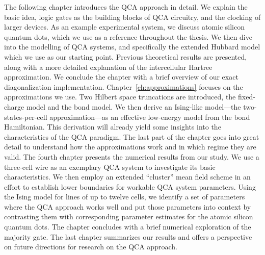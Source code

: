 The following chapter introduces the QCA approach in detail. We explain the
basic idea, logic gates as the building blocks of QCA circuitry, and the
clocking of larger devices. As an example experimental system, we discuss atomic
silicon quantum dots, which we use as a reference throughout the thesis. We then
dive into the modelling of QCA systems, and specifically the extended Hubbard
model which we use as our starting point. Previous theoretical results are
presented, along with a more detailed explanation of the intercellular Hartree
approximation. We conclude the chapter with a brief overview of our exact
diagonalization implementation. Chapter~\ref{ch:approximations} focuses on the
approximations we use. Two Hilbert space truncations are introduced, the
fixed-charge model and the bond model. We then derive an Ising-like model---the
two-states-per-cell approximation---as an effective low-energy model from the
bond Hamiltonian. This derivation will already yield some insights into the
characteristics of the QCA paradigm. The last part of the chapter goes into
great detail to understand how the approximations work and in which regime they
are valid. The fourth chapter presents the numerical results from our study. We
use a three-cell wire as an exemplary QCA system to investigate its basic
characteristics. We then employ an extended ``cluster'' mean field scheme in an
effort to establish lower boundaries for workable QCA system parameters. Using
the Ising model for lines of up to twelve cells, we identify a set of parameters
where the QCA approach works well and put those parameters into context by
contrasting them with corresponding parameter estimates for the atomic silicon
quantum dots. The chapter concludes with a brief numerical exploration of the
majority gate. The last chapter summarizes our results and offers a perspective
on future directions for research on the QCA approach.
